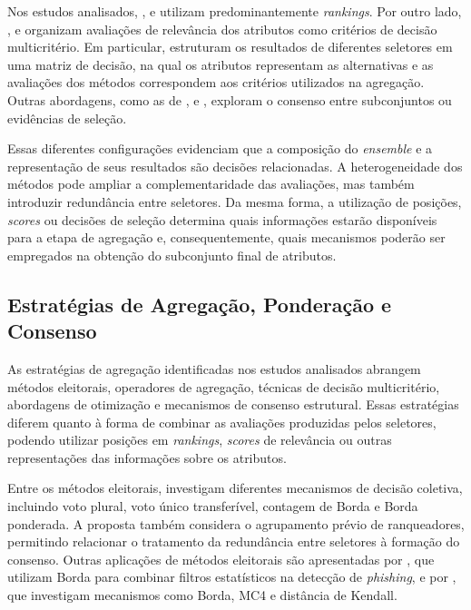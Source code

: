 Nos estudos analisados, ,  e  utilizam predominantemente \textit{rankings}. Por outro lado, ,  e  organizam avaliações de relevância dos atributos como critérios de decisão multicritério. Em particular,  estruturam os resultados de diferentes seletores em uma matriz de decisão, na qual os atributos representam as alternativas e as avaliações dos métodos correspondem aos critérios utilizados na agregação. Outras abordagens, como as de ,  e , exploram o consenso entre subconjuntos ou evidências de seleção.

Essas diferentes configurações evidenciam que a composição do \textit{ensemble} e a representação de seus resultados são decisões relacionadas. A heterogeneidade dos métodos pode ampliar a complementaridade das avaliações, mas também introduzir redundância entre seletores. Da mesma forma, a utilização de posições, \textit{scores} ou decisões de seleção determina quais informações estarão disponíveis para a etapa de agregação e, consequentemente, quais mecanismos poderão ser empregados na obtenção do subconjunto final de atributos.

\subsection{Estratégias de Agregação, Ponderação e Consenso}
\label{subsec:efs-agregacao}

As estratégias de agregação identificadas nos estudos analisados abrangem métodos eleitorais, operadores de agregação, técnicas de decisão multicritério, abordagens de otimização e mecanismos de consenso estrutural. Essas estratégias diferem quanto à forma de combinar as avaliações produzidas pelos seletores, podendo utilizar posições em \textit{rankings}, \textit{scores} de relevância ou outras representações das informações sobre os atributos.

Entre os métodos eleitorais,  investigam diferentes mecanismos de decisão coletiva, incluindo voto plural, voto único transferível, contagem de Borda e Borda ponderada. A proposta também considera o agrupamento prévio de ranqueadores, permitindo relacionar o tratamento da redundância entre seletores à formação do consenso. Outras aplicações de métodos eleitorais são apresentadas por , que utilizam Borda para combinar filtros estatísticos na detecção de \textit{phishing}, e por , que investigam mecanismos como Borda, MC4 e distância de Kendall.

